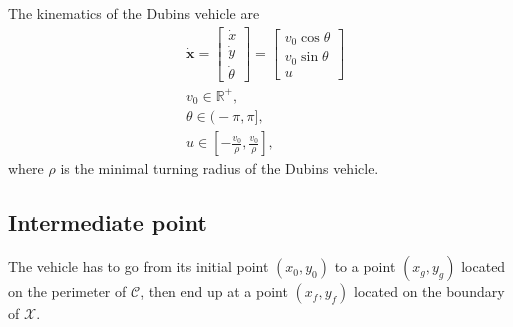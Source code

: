 \documentclass[12pt]{article}
\begin{document}
The kinematics of the Dubins vehicle are
\begin{align}
    &\mathbf{\dot{x}} =
    \begin{bmatrix}
        \dot{x}\\\dot{y}\\\dot{\theta}
    \end{bmatrix}
    = \begin{bmatrix}
        v_0\cos\theta\\v_0\sin\theta\\u
    \end{bmatrix}\\
    &v_0\in \mathbb{R}^+,\\
    &\theta \in (\!-\!\pi,\pi],\\
    &u \in \left[-\frac{v_0}{\rho},\frac{v_0}{\rho}\right],
\end{align}
where $\rho$ is the minimal turning radius of the Dubins vehicle.

\subsection{Intermediate point}

The vehicle has to go from its initial point $(x_0,y_0)$ to a point $(x_g,y_g)$ located on the perimeter of $\mathcal{C}$, then end up at a point $(x_f,y_f)$ located on the boundary of $\mathcal{X}$.

\end{document}
